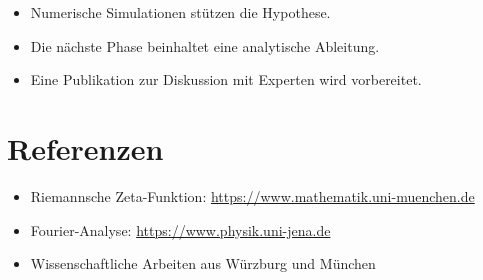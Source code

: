 \documentclass[a4paper,12pt]{article}
\begin{document}
\begin{itemize}
    \item Numerische Simulationen stützen die Hypothese.
    \item Die nächste Phase beinhaltet eine analytische Ableitung.
    \item Eine Publikation zur Diskussion mit Experten wird vorbereitet.
\end{itemize}

\section*{Referenzen}
\begin{itemize}
    \item Riemannsche Zeta-Funktion: \url{https://www.mathematik.uni-muenchen.de}
    \item Fourier-Analyse: \url{https://www.physik.uni-jena.de}
    \item Wissenschaftliche Arbeiten aus Würzburg und München
\end{itemize}
\end{document}
